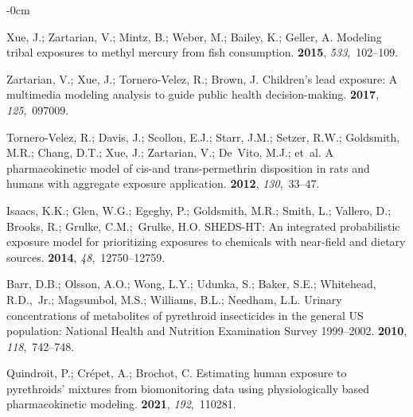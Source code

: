 \documentclass[toxics,article,accept,pdftex,moreauthors]{Definitions/mdpi}
\begin{document}
\begin{adjustwidth}{-\extralength}{0cm}
\begin{thebibliography}{999}
Xue, J.; Zartarian, V.; Mintz, B.; Weber, M.; Bailey, K.; Geller, A.
\newblock Modeling tribal exposures to methyl mercury from fish consumption.
 {\bf 2015}, {\em
  533},~102--109.

Zartarian, V.; Xue, J.; Tornero-Velez, R.; Brown, J.
\newblock Children’s lead exposure: A multimedia modeling analysis to guide
  public health decision-making.
 {\bf 2017}, {\em
  125},~097009.

Tornero-Velez, R.; Davis, J.; Scollon, E.J.; Starr, J.M.; Setzer, R.W.;
  Goldsmith, M.R.; Chang, D.T.; Xue, J.; Zartarian, V.; De~Vito, M.J.;  et~al.
\newblock A pharmacokinetic model of cis-and trans-permethrin disposition in
  rats and humans with aggregate exposure application.
 {\bf 2012}, {\em 130},~33--47.

Isaacs, K.K.; Glen, W.G.; Egeghy, P.; Goldsmith, M.R.; Smith, L.; Vallero, D.;
  Brooks, R.; Grulke, C.M.;~Grulke, H.O.
\newblock SHEDS-HT: An integrated probabilistic exposure model for prioritizing
  exposures to chemicals with near-field and dietary sources.
 {\bf 2014}, {\em
  48},~12750--12759.

Barr, D.B.; Olsson, A.O.; Wong, L.Y.; Udunka, S.; Baker, S.E.; Whitehead,
  R.D.,~Jr.; Magsumbol, M.S.; Williams, B.L.; Needham, L.L.
\newblock Urinary concentrations of metabolites of pyrethroid insecticides in
  the general US population: National Health and Nutrition Examination Survey
  1999--2002.
 {\bf 2010}, {\em
  118},~742--748.

Quindroit, P.; Cr{\'e}pet, A.; Brochot, C.
\newblock Estimating human exposure to pyrethroids’ mixtures from
  biomonitoring data using physiologically based pharmacokinetic modeling.
 {\bf 2021}, {\em 192},~110281.


\end{thebibliography}
\end{adjustwidth}
\end{document}
